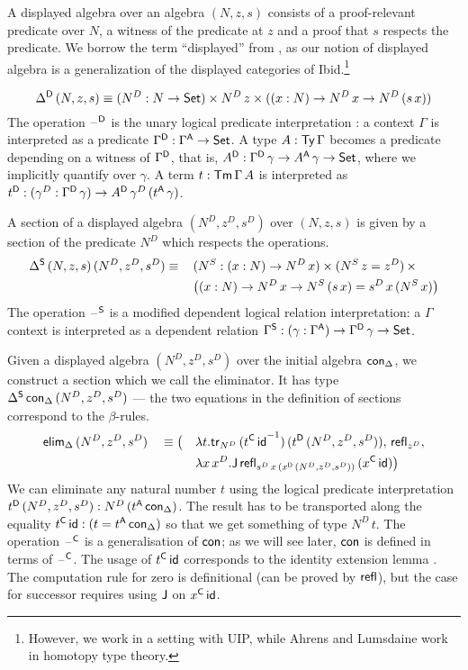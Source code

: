 \documentclass[acmsmall,review]{acmart}\settopmatter{printfolios=true,printccs=false,printacmref=false}
\begin{document}
A displayed algebra over an algebra $(N,z,s)$ consists of a
proof-relevant predicate over $N$, a witness of the predicate at $z$
and a proof that $s$ respects the predicate. We borrow the term
``displayed'' from \cite{displayedCategories}, as our notion of
displayed algebra is a generalization of the displayed categories of Ibid.\footnote{However, we work in a setting with UIP, while Ahrens and Lumsdaine work in homotopy type theory.}

\[
\Delta^{\mathsf{D}}\,(N,z,s) \equiv (N^D:N\rightarrow\mathsf{Set})\times N^D\,z\times ((x:N)\rightarrow N^D\,x\rightarrow N^D\,(s\,x))
\]
The operation $\mathord{\hspace{1pt}\text{--}\hspace{1pt}}^{\mathsf{D}}$ is the unary logical predicate
interpretation \cite{bernardy12parametricity}: a context $\Gamma$ is
interpreted as a predicate $\Gamma^{\mathsf{D}}:\Gamma^{\mathsf{A}}\rightarrow\mathsf{Set}$. A type
$A:\mathsf{Ty}\,\Gamma$ becomes a predicate depending on a witness of
$\Gamma^{\mathsf{D}}$, that is, $A^{\mathsf{D}}:\Gamma^{\mathsf{D}}\,\gamma\rightarrow A^{\mathsf{A}}\,\gamma\rightarrow\mathsf{Set}$,
where we implicitly quantify over $\gamma$. A term
$t:\mathsf{Tm}\,\Gamma\,A$ is interpreted as
$t^{\mathsf{D}}:(\gamma^D:\Gamma^{\mathsf{D}}\,\gamma)\rightarrow A^{\mathsf{D}}\,\gamma^D\,(t^{\mathsf{A}}\,\gamma)$.

A section of a displayed algebra $(N^D,z^D,s^D)$ over $(N,z,s)$ is
given by a section of the predicate $N^D$ which respects the
operations.
\begin{alignat*}{5}
  & \Delta^{\mathsf{S}}\,(N,z,s)\,(N^D,z^D,s^D) \equiv\, && (N^S:(x:N)\rightarrow N^D\,x)\times (N^S\,z=z^D)\,\times \\
  & && \big((x:N)\rightarrow N^D\,x\rightarrow N^S\,(s\,x) = s^D\,x\,(N^S\,x)\big)
\end{alignat*}
The operation $\mathord{\hspace{1pt}\text{--}\hspace{1pt}}^{\mathsf{S}}$ is a modified dependent logical relation
interpretation: a $\Gamma$ context is interpreted as a dependent
relation $\Gamma^{\mathsf{S}}:(\gamma:\Gamma^{\mathsf{A}})\rightarrow\Gamma^{\mathsf{D}}\,\gamma\rightarrow\mathsf{Set}$.

Given a displayed algebra $(N^D,z^D,s^D)$ over the initial algebra $\mathsf{con}_\Delta$,
we construct a section which we call the eliminator. It has type
$\Delta^{\mathsf{S}}\,\mathsf{con}_\Delta\,(N^D,z^D,s^D)$ --- the two equations in the
definition of sections correspond to the $\beta$-rules.
\begin{alignat*}{5}
  & \mathsf{elim}_\Delta\,(N^D,z^D,s^D) && \equiv \big( && \lambda t.\mathsf{tr}_{N^D}\,({t^{\mathsf{C}}\,\mathsf{id}}^{-1})\,(t^{\mathsf{D}}\,(N^D,z^D,s^D)),\, \mathsf{refl}_{z^D}, \\
  & && && \lambda x\,x^D. \mathsf{J}\,\mathsf{refl}_{s^D\,x\,(x^{\mathsf{D}}\,(N^D,z^D,s^D))}\,(x^{\mathsf{C}}\,\mathsf{id})\big)
\end{alignat*}
We can eliminate any natural number $t$ using the logical predicate
interpretation $t^{\mathsf{D}}\,(N^D,z^D,s^D): N^D\,(t^{\mathsf{A}}\,\mathsf{con}_\Delta)$. The
result has to be transported along the equality $t^{\mathsf{C}}\,\mathsf{id} : (t =
t^{\mathsf{A}}\,\mathsf{con}_\Delta)$ so that we get something of type $N^D\,t$. The
operation $\mathord{\hspace{1pt}\text{--}\hspace{1pt}}^{\mathsf{C}}$ is a generalisation of $\mathsf{con}$; as we will see
later, $\mathsf{con}$ is defined in terms of $\mathord{\hspace{1pt}\text{--}\hspace{1pt}}^{\mathsf{C}}$. The usage of
$t^{\mathsf{C}}\,\mathsf{id}$ corresponds to the identity extension lemma
\cite{atkey}. The computation rule for zero is definitional (can be
proved by $\mathsf{refl}$), but the case for successor requires using $\mathsf{J}$ on
$x^{\mathsf{C}}\,\mathsf{id}$.
\end{document}

